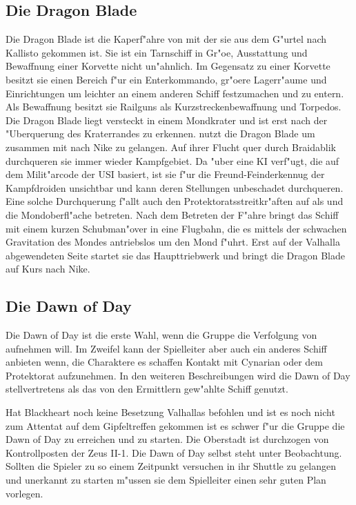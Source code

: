\subsection{Die Dragon Blade}

Die Dragon Blade ist die Kaperf"ahre von \xl{} mit der sie aus dem G"urtel nach Kallisto gekommen ist. Sie ist ein Tarnschiff in Gr"o\3e, Ausstattung und Bewaffnung einer Korvette nicht un"ahnlich. Im Gegensatz zu einer Korvette besitzt sie einen Bereich f"ur ein Enterkommando, gr"o\3ere Lagerr"aume und Einrichtungen um leichter an einem anderen Schiff festzumachen und zu entern. Als Bewaffnung besitzt sie Railguns als Kurzstreckenbewaffnung und Torpedos. Die Dragon Blade liegt versteckt in einem Mondkrater und ist erst nach der "Uberquerung des Kraterrandes zu erkennen. \xl{} nutzt die Dragon Blade um zusammen mit \ml{} nach Nike zu gelangen. Auf ihrer Flucht quer durch Braidablik durchqueren sie immer wieder Kampfgebiet. Da \xl{} "uber eine KI verf"ugt, die auf dem Milit"arcode der USI basiert, ist sie f"ur die Freund-Feinderkennug der Kampfdroiden unsichtbar und kann deren Stellungen unbeschadet durchqueren. Eine solche Durchquerung f"allt auch den Protektoratsstreitkr"aften auf als \xl{} und \ml{} die Mondoberfl"ache betreten. Nach dem Betreten der F"ahre bringt \xl{} das Schiff mit einem kurzen Schubman"over in eine Flugbahn, die es mittels der schwachen Gravitation des Mondes antriebslos um den Mond f"uhrt. Erst auf der Valhalla abgewendeten Seite startet sie das Haupttriebwerk und bringt die Dragon Blade auf Kurs nach Nike. 

\subsection{Die Dawn of Day}
Die Dawn of Day ist die erste Wahl, wenn die Gruppe die Verfolgung von \xl{} aufnehmen will. Im Zweifel kann der Spielleiter aber auch ein anderes Schiff anbieten wenn, die Charaktere es schaffen Kontakt mit Cynarian oder dem Protektorat aufzunehmen. In den weiteren Beschreibungen wird die Dawn of Day stellvertretens als das von den Ermittlern gew"ahlte Schiff genutzt.

Hat Blackheart noch keine Besetzung Valhallas befohlen und ist es noch nicht zum Attentat auf dem Gipfeltreffen gekommen ist es schwer f"ur die Gruppe die Dawn of Day zu erreichen und zu starten. Die Oberstadt ist durchzogen von Kontrollposten der Zeus II-1. Die Dawn of Day selbst steht unter Beobachtung. Sollten die Spieler zu so einem Zeitpunkt versuchen in ihr Shuttle zu gelangen und unerkannt zu starten m"ussen sie dem Spielleiter einen sehr guten Plan vorlegen.

